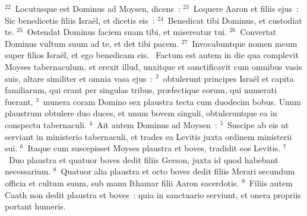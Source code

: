 ${}^{22}$~Locutusque est Dominus ad Moysen, dicens~:
${}^{23}$~Loquere Aaron et filiis ejus~: Sic benedicetis filiis Isra\"el, et dicetis eis~:
${}^{24}$~Benedicat tibi Dominus, et custodiat te.
${}^{25}$~Ostendat Dominus faciem suam tibi, et misereatur tui.
${}^{26}$~Convertat Dominus vultum suum ad te, et det tibi pacem.
${}^{27}$~Invocabuntque nomen meum super filios Isra\"el, et ego benedicam eis.
~\lettrine[lines=10,image=true,loversize=0.05,lraise=-0.03]{F}{}actum est autem in die qua complevit Moyses tabernaculum, et erexit illud, unxitque et sanctificavit cum omnibus vasis suis, altare similiter et omnia vasa ejus~:
${}^{2}$~obtulerunt principes Isra\"el et capita familiarum, qui erant per singulas tribus, pr\ae fectique eorum, qui numerati fuerant,
${}^{3}$~munera coram Domino sex plaustra tecta cum duodecim bobus. Unum plaustrum obtulere duo duces, et unum bovem singuli, obtuleruntque ea in conspectu tabernaculi.
${}^{4}$~Ait autem Dominus ad Moysen~:
${}^{5}$~Suscipe ab eis ut serviant in ministerio tabernaculi, et trades ea Levitis juxta ordinem ministerii sui.
${}^{6}$~Itaque cum suscepisset Moyses plaustra et boves, tradidit eos Levitis.
${}^{7}$~Duo plaustra et quatuor boves dedit filiis Gerson, juxta id quod habebant necessarium.
${}^{8}$~Quatuor alia plaustra et octo boves dedit filiis Merari secundum officia et cultum suum, sub manu Ithamar filii Aaron sacerdotis.
${}^{9}$~Filiis autem Caath non dedit plaustra et boves~: quia in sanctuario serviunt, et onera propriis portant humeris.


